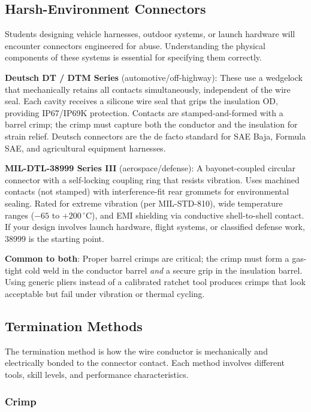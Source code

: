 \documentclass[11pt,letterpaper,twoside,openany]{book}
\newcommand{\degC}{\ensuremath{{}^{\circ}\text{C}}}
\begin{document}
\subsection{Harsh-Environment Connectors}

Students designing vehicle harnesses, outdoor systems, or launch hardware will encounter connectors engineered for abuse. Understanding the physical components of these systems is essential for specifying them correctly.

\textbf{Deutsch DT / DTM Series} (automotive/off-highway): These use a wedgelock that mechanically retains all contacts simultaneously, independent of the wire seal. Each cavity receives a silicone wire seal that grips the insulation OD, providing IP67/IP69K protection. Contacts are stamped-and-formed with a barrel crimp; the crimp must capture both the conductor and the insulation for strain relief. Deutsch connectors are the de facto standard for SAE Baja, Formula SAE, and agricultural equipment harnesses.

\textbf{MIL-DTL-38999 Series III} (aerospace/defense): A bayonet-coupled circular connector with a self-locking coupling ring that resists vibration. Uses machined contacts (not stamped) with interference-fit rear grommets for environmental sealing. Rated for extreme vibration (per MIL-STD-810), wide temperature ranges ($-65$ to $+200$\,\degC{}), and EMI shielding via conductive shell-to-shell contact. If your design involves launch hardware, flight systems, or classified defense work, 38999 is the starting point.

\textbf{Common to both}: Proper barrel crimps are critical; the crimp must form a gas-tight cold weld in the conductor barrel \emph{and} a secure grip in the insulation barrel. Using generic pliers instead of a calibrated ratchet tool produces crimps that look acceptable but fail under vibration or thermal cycling.


\subsection{Termination Methods}
\label{sec:termination}

The termination method is how the wire conductor is mechanically and electrically bonded to the connector contact. Each method involves different tools, skill levels, and performance characteristics.

\subsubsection{Crimp}
\end{document}
